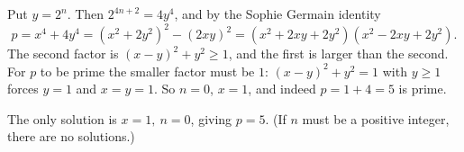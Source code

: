 Put $y=2^n$. Then $2^{4n+2}=4y^4$, and by the Sophie Germain identity
\[
p=x^4+4y^4=\left(x^2+2y^2\right)^2-(2xy)^2=\left(x^2+2xy+2y^2\right)\left(x^2-2xy+2y^2\right).
\]
The second factor is $(x-y)^2+y^2\ge1$, and the first is larger than the second. For $p$ to be prime the smaller factor must be $1$: $(x-y)^2+y^2=1$ with $y\ge1$ forces $y=1$ and $x=y=1$. So $n=0$, $x=1$, and indeed $p=1+4=5$ is prime.

The only solution is $\boxed{x=1,\ n=0}$, giving $p=5$. (If $n$ must be a positive integer, there are no solutions.)
